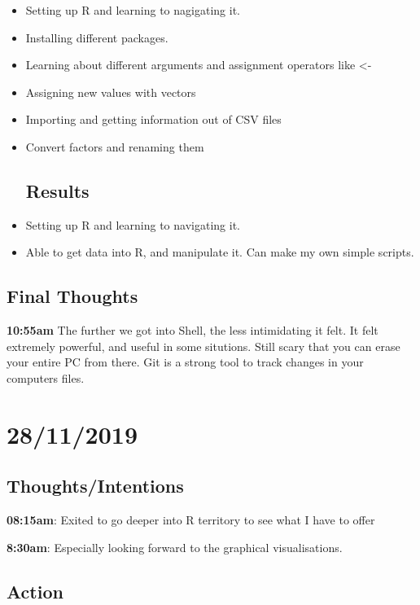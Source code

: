 \documentclass{article}
\begin{document}
\begin{itemize}
\item Setting up R and learning to nagigating it.
\item Installing different packages.
\item Learning about different arguments and assignment operators like <-
\item Assigning new values with vectors
\item Importing and getting information out of CSV files
\item Convert factors and renaming them

\subsection{Results}

\item Setting up R and learning to navigating it.
\item Able to get data into R, and manipulate it. Can make my own simple scripts.

\end{itemize}


\subsection{Final Thoughts}
\textbf{10:55am} The further we got into Shell, the less intimidating it felt. It felt extremely powerful, and useful in some situtions. Still scary that you can erase your entire PC from there. Git is a strong tool to track changes in your computers files.

\section{28/11/2019}
\subsection{Thoughts/Intentions}
\textbf{08:15am}: Exited to go deeper into R territory to see what I have to offer

\textbf{8:30am}: Especially looking forward to the graphical visualisations. 

\subsection{Action}
\end{document}
